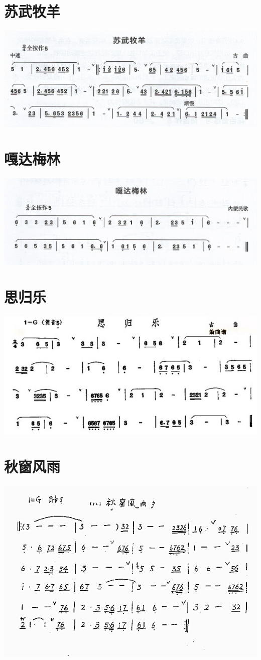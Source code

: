 \documentclass[cn,pad,chinese,chinesefont=nofont]{elegantbook}
\begin{document}
\section{苏武牧羊}
	\includegraphics[width=\textwidth]{dongxiao/Scan 17-2.jpeg}
\section{嘎达梅林}
	\includegraphics[width=\textwidth]{dongxiao/Scan 17-3.jpeg}
\section{思归乐}
	\includegraphics[width=\textwidth]{dongxiao/思归乐.jpg}
\section{秋窗风雨}
    \includegraphics[width=\textwidth]{dongxiao/秋窗风雨.jpg}
\end{document}
